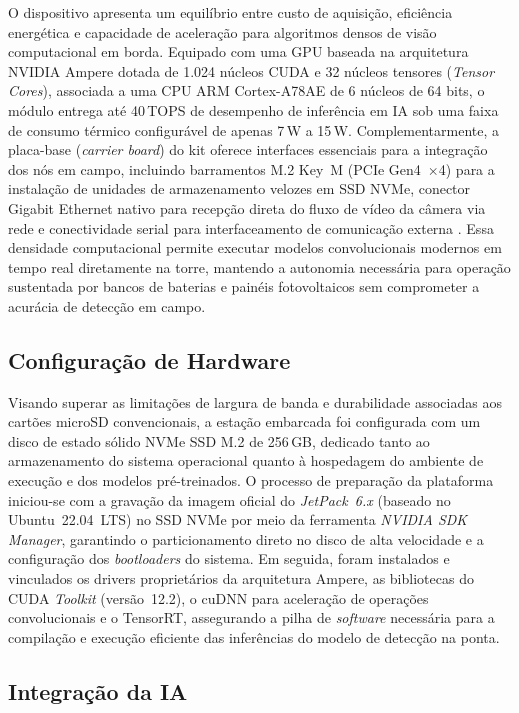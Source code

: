 O dispositivo apresenta um equilíbrio entre custo de aquisição, eficiência energética e capacidade de aceleração para algoritmos densos de visão computacional em borda. Equipado com uma GPU baseada na arquitetura NVIDIA Ampere dotada de 1.024 núcleos CUDA e 32 núcleos tensores (\textit{Tensor Cores}), associada a uma CPU ARM Cortex-A78AE de 6 núcleos de 64 bits, o módulo
entrega até 40\,TOPS de desempenho de inferência em IA sob uma faixa de consumo térmico configurável de apenas 7\,W a 15\,W. Complementarmente, a placa-base (\textit{carrier board}) do kit oferece interfaces essenciais para a integração dos nós em campo, incluindo barramentos M.2 Key~M (PCIe Gen4~$\times$4) para a instalação de unidades de armazenamento velozes em SSD NVMe, conector Gigabit Ethernet nativo para recepção direta do fluxo de vídeo da câmera via rede e
conectividade serial para interfaceamento de comunicação externa \cite{nvidia2026jetson}. Essa densidade computacional permite executar modelos convolucionais modernos em tempo real diretamente na torre, mantendo a autonomia necessária para operação sustentada por bancos de baterias e painéis
fotovoltaicos sem comprometer a acurácia de detecção em campo.

\subsection{Configuração de Hardware}
\label{subsec:config_hardware}

Visando superar as limitações de largura de banda e durabilidade associadas aos cartões microSD convencionais, a estação embarcada foi configurada com um disco de estado sólido NVMe SSD M.2 de 256\,GB, dedicado tanto ao armazenamento do sistema operacional quanto à hospedagem do ambiente de execução e dos modelos pré-treinados. O processo de preparação da plataforma iniciou-se com a
gravação da imagem oficial do \textit{JetPack~6.x} (baseado no Ubuntu~22.04~LTS) no SSD NVMe por meio da ferramenta \textit{NVIDIA SDK Manager}, garantindo o particionamento direto no disco de alta velocidade e a configuração dos \textit{bootloaders} do sistema. Em seguida, foram instalados
e vinculados os drivers proprietários da arquitetura Ampere, as bibliotecas do CUDA \textit{Toolkit} (versão~12.2), o cuDNN para aceleração de operações convolucionais e o TensorRT, assegurando a pilha de \textit{software} necessária para a compilação e execução eficiente das inferências do
modelo de detecção na ponta.

\subsection{Integração da IA}
\label{subsec:integracao_ia}

